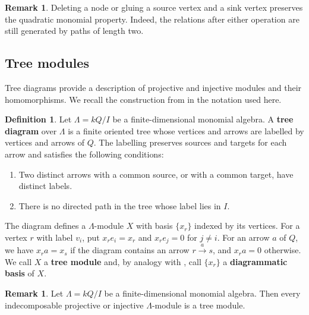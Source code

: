 \documentclass[11pt]{article}
\providecommand{\varLambda}{\Lambda}
\theoremstyle{definition}
\newtheorem{definition}[theorem]{Definition}
\newtheorem{remark}[theorem]{Remark}
\begin{document}
		\begin{remark}\label{remark of quadratic monomial node type}
			Deleting a node or gluing a source vertex and a sink vertex preserves the quadratic monomial property.
			Indeed, the relations after either operation are still generated by paths of length two.
		\end{remark}

	\subsection{Tree modules}\label{subsection of tree modules}
		Tree diagrams provide a description of projective and injective modules and their homomorphisms. We recall the construction from \cite{Kra91} in the notation used here.

		\begin{definition}\label{definition of diagrammatic basis}
			Let $\varLambda=kQ/I$ be a finite-dimensional monomial algebra.
			A \textbf{tree diagram} over $\varLambda$ is a finite oriented tree whose vertices and arrows are labelled by vertices and arrows of $Q$.
			The labelling preserves sources and targets for each arrow and satisfies the following conditions:
			\begin{enumerate}
				\item Two distinct arrows with a common source, or with a common target, have distinct labels.
				\item There is no directed path in the tree whose label lies in $I$.
			\end{enumerate}
			The diagram defines a $\varLambda$-module $X$ with basis $\{x_r\}$ indexed by its vertices.
			For a vertex $r$ with label $v_i$, put $x_re_i=x_r$ and $x_re_j=0$ for $j\ne i$.
			For an arrow $a$ of $Q$, we have $x_ra=x_s$ if the diagram contains an arrow $r\xrightarrow{a}s$, and $x_ra=0$ otherwise.
			We call $X$ a \textbf{tree module} and, by analogy with \cite[Section~1]{Ant07}, call $\{x_r\}$ a \textbf{diagrammatic basis} of $X$.
		\end{definition}

		\begin{remark}\label{lemma of projective injective tree bases}
			Let $\varLambda=kQ/I$ be a finite-dimensional monomial algebra.
			Then every indecomposable projective or injective $\varLambda$-module is a tree module.
		\end{remark}
\end{document}
